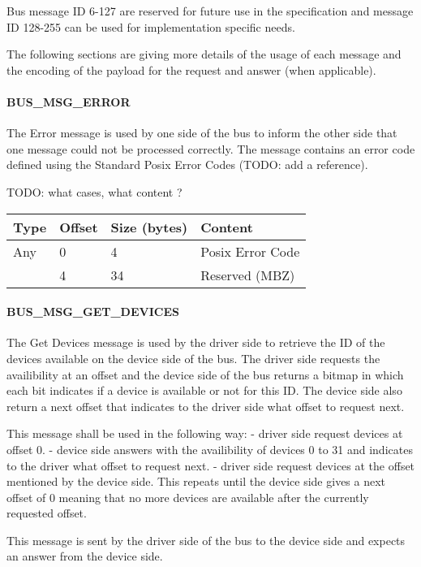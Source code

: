 Bus message ID 6-127 are reserved for future use in the specification and
message ID 128-255 can be used for implementation specific needs.

The following sections are giving more details of the usage of each message
and the encoding of the payload for the request and answer (when applicable).

\newcommand{\busdef}[1]{\paragraph{BUS_MSG_#1}\label{sec:Virtio Transport Options / Virtio Over Messages / Message Bus / Messages / BUS_MSG_#1}}

\busdef{ERROR}

The Error message is used by one side of the bus to inform the other side that
one message could not be processed correctly. The message contains an error
code defined using the Standard Posix Error Codes (TODO: add a reference).

TODO: what cases, what content ?

\begin{tabular}{|l|l|l|l|}
\hline
Type & Offset & Size (bytes) & Content \\
\hline \hline
Any     & 0 & 4 & Posix Error Code \\
        & 4 & 34 & Reserved (MBZ) \\
\hline
\end{tabular}

\busdef{GET_DEVICES}

The Get Devices message is used by the driver side to retrieve the ID of the
devices available on the device side of the bus.
The driver side requests the availibility at an offset and the device side of
the bus returns a bitmap in which each bit indicates if a device is available
or not for this ID. The device side also return a next offset that indicates
to the driver side what offset to request next.

This message shall be used in the following way:
- driver side request devices at offset 0.
- device side answers with the availibility of devices 0 to 31 and indicates to
  the driver what offset to request next.
- driver side request devices at the offset mentioned by the device side.
This repeats until the device side gives a next offset of 0 meaning that no
more devices are available after the currently requested offset.

This message is sent by the driver side of the bus to the device side and
expects an answer from the device side.

